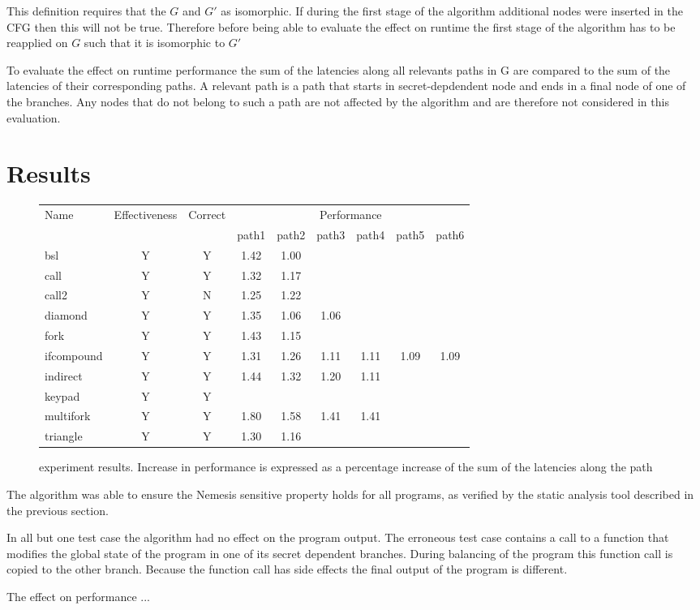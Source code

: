This definition requires that the $G$ and $G'$ as isomorphic. If during the first stage of the algorithm additional nodes were inserted in the CFG
then this will not be true. Therefore before being able to evaluate the effect on runtime the first stage of the algorithm has to be reapplied on $G$ such 
that it is isomorphic to $G'$

To evaluate the effect on runtime performance the sum of the latencies along all relevants paths in G are compared to the sum of the latencies of their corresponding paths. A relevant path is a path that starts in secret-depdendent node and ends in a final node of one of the branches. Any nodes that do not belong to such a path 
are not affected by the algorithm and are therefore not considered in this evaluation. 

    
\section{Results}

\begin{figure}
    \centering
    \begin{tabular}{ l | c | c | c c c c c c }
    Name & Effectiveness & Correct & \multicolumn{6}{c}{Performance} \\ 
     & & & path1 & path2 & path3 & path4 & path5 & path6\\
     \hline 
    bsl         & Y & Y & 1.42 & 1.00 & & & &  \\ 
    call        & Y & Y & 1.32 & 1.17 & &  & & \\  
    call2       & Y & N & 1.25 & 1.22 & &  & & \\
    diamond     & Y & Y & 1.35 & 1.06 & 1.06 & & &  \\ 
    fork        & Y & Y & 1.43 & 1.15 & & & &  \\  
    ifcompound  & Y & Y & 1.31 & 1.26 & 1.11 & 1.11 & 1.09 & 1.09  \\
    indirect    & Y & Y & 1.44 & 1.32 & 1.20 & 1.11 & & \\ 
    keypad      & Y & Y &  &  &  &  &  &   \\  
    multifork   & Y & Y & 1.80 & 1.58 & 1.41 & 1.41 & &   \\
    triangle    & Y & Y & 1.30 & 1.16 & & & &  \\
    \end{tabular}
    \caption{experiment results. Increase in performance is expressed as a percentage increase of the sum of the latencies along the path}
    \label{fig:experiment results }
\end{figure}

The algorithm was able to ensure the Nemesis sensitive property holds for all programs, as verified by the static analysis tool described in the previous section. 

In all but one test case the algorithm had no effect on the program output. The erroneous test case contains a call to a function that modifies the global state of the program in one of its secret dependent branches. During balancing of the program this function call is copied to the other branch. Because the function call 
has side effects the final output of the program is different. 

The effect on performance ... 